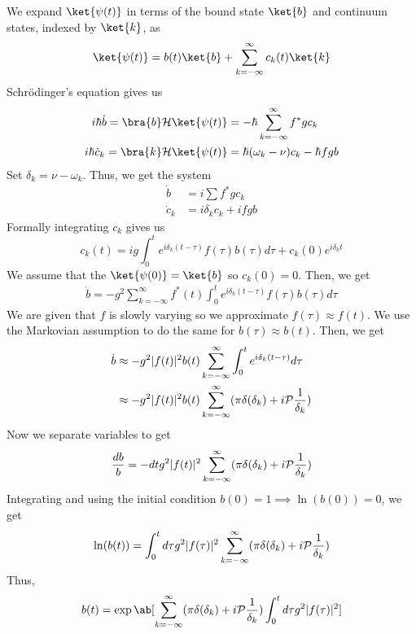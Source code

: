 \documentclass[12pt]{article}
\begin{document}
\begin{ans}
    We expand $\ket{\psi(t)}$ in terms of the bound state $\ket{b}$ and continuum states, indexed by $\ket{k}$, as 
    \begin{align*}
        \ket{\psi(t)} = b(t)\ket{b} + \sum_{k = -\infty}^\infty c_k(t) \ket{k}
    \end{align*}
    Schrödinger's equation gives us 
    \begin{align*}
        i\hbar \dot b = \bra{b} \HH \ket{\psi(t)} &= -\hbar \sum_{k = -\infty}^\infty f^*g c_k \\ 
        i\hbar \dot c_k  = \bra{k}\HH \ket{\psi(t)} &= \hbar (\omega_k - \nu)c_k -\hbar fg b
    \end{align*}
    Set $\delta_k = \nu - \omega_k$. Thus, we get the system 
    \begin{align*}
        \dot b &= i\sum f^*g c_k \\ 
        \dot c_k &= i\delta_k c_k + ifgb
    \end{align*}
    Formally integrating $c_k$ gives us 
    \[c_k(t) = ig\int_0^t e^{i\delta_k(t - \tau)}f(\tau)b(\tau)d\tau + c_k(0)e^{i\delta_kt}\]
    We assume that the $\ket{\psi(0)} = \ket{b}$ so $c_k(0) = 0$.
    Then, we get 
    \begin{align*}
        \dot b = -g^2 \sum_{k = -\infty}^\infty f^*(t)\int_0^t e^{i\delta_k(t - \tau)}f(\tau)b(\tau)d\tau 
    \end{align*}
    We are given that $f$ is slowly varying so we approximate $f(\tau)\approx f(t)$. We use the Markovian assumption to do the same for $b(\tau) \approx b(t)$. Then, we get 
    \begin{align*}
        \dot b &\approx -g^2 |f(t)|^2 b(t) \sum_{k = -\infty}^{\infty}\int_0^t e^{i\delta_k(t - \tau)}d\tau \\ 
        &\approx  -g^2 |f(t)|^2 b(t) \sum_{k = -\infty}^{\infty}(\pi \delta(\delta_k) + i\mathcal{P}\frac1{\delta_k})
    \end{align*}
    Now we separate variables to get 
    \begin{align*}
        \frac{db}{b} = - dtg^2|f(t)|^2 \sum_{k = -\infty}^{\infty}(\pi \delta(\delta_k) + i\mathcal{P}\frac1{\delta_k})
    \end{align*}
    Integrating and using the initial condition $b(0) = 1 \implies \ln(b(0)) = 0$, we get
    \[\ln(b(t)) = \int_0^t d\tau g^2|f(\tau)|^2\sum_{k = -\infty}^\infty  (\pi \delta(\delta_k) + i\mathcal{P}\frac1{\delta_k})\]
    Thus, 
    \[
    b(t) = \exp\ab[\sum_{k = -\infty}^\infty  (\pi \delta(\delta_k) + i\pv\frac1{\delta_k}) \int_0^t d\tau g^2|f(\tau)|^2]
    \]
\end{ans}
\end{document}
